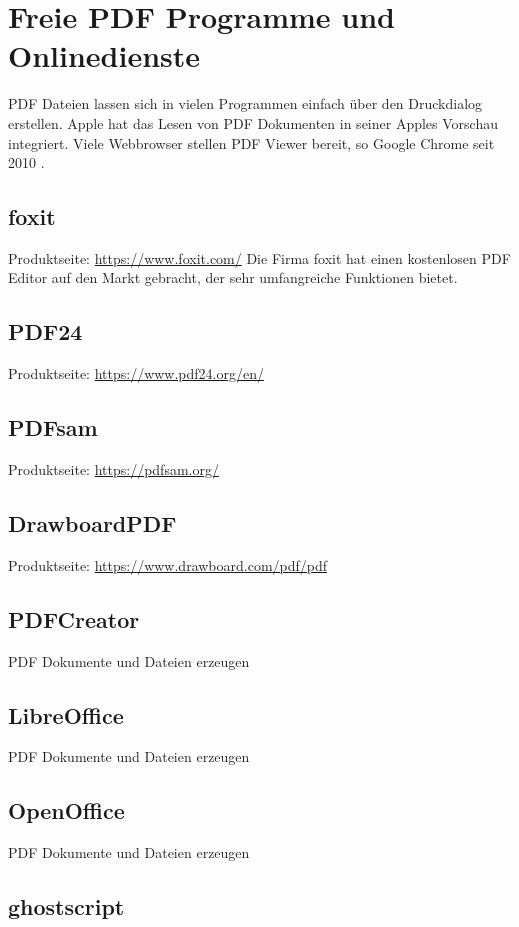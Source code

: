 \section{Freie PDF Programme und Onlinedienste}
PDF Dateien lassen sich in vielen Programmen einfach über den Druckdialog erstellen. Apple hat das Lesen von PDF Dokumenten in seiner Apples Vorschau integriert. Viele Webbrowser stellen PDF Viewer bereit, so Google Chrome seit 2010 \cite{wiki-pdf-de}.

\subsection{foxit}
Produktseite: \url{https://www.foxit.com/}
Die Firma foxit hat einen kostenlosen PDF Editor auf den Markt gebracht, der sehr umfangreiche Funktionen bietet.

\subsection{PDF24}
Produktseite: \url{https://www.pdf24.org/en/}

\subsection{PDFsam}
Produktseite: \url{https://pdfsam.org/}

\subsection{DrawboardPDF}
Produktseite: \url{https://www.drawboard.com/pdf/pdf}

\subsection{PDFCreator}
PDF Dokumente und Dateien erzeugen

\subsection{LibreOffice}
PDF Dokumente und Dateien erzeugen

\subsection{OpenOffice}
PDF Dokumente und Dateien erzeugen

\subsection{ghostscript}

